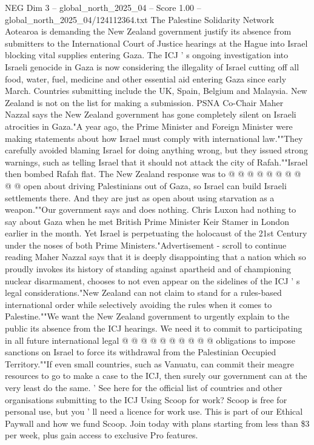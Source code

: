 \begin{textsample}{NEG Dim 3 – global\_north\_2025\_04 – Score 1.00 – global\_north\_2025\_04/124112364.txt}  \label{ex:f3_neg_416}
The Palestine Solidarity Network Aotearoa is demanding the New Zealand government justify its absence from submitters to the International Court of Justice hearings at the Hague into Israel blocking vital supplies entering Gaza.
The ICJ ' s ongoing investigation into Israeli genocide in Gaza is now considering the illegality of Israel cutting off all food, water, fuel, medicine and other essential aid entering Gaza since early March.
Countries submitting include the UK, Spain, Belgium and Malaysia.
New Zealand is not on the list for making a submission.
PSNA Co-Chair Maher Nazzal says the New Zealand government has gone completely silent on Israeli atrocities in Gaza."A year ago, the Prime Minister and Foreign Minister were making statements about how Israel must comply with international law.""They carefully avoided blaming Israel for doing anything wrong, but they issued strong warnings, such as telling Israel that it should not attack the city of Rafah.""Israel then bombed Rafah flat.
The New Zealand response was to @ @ @ @ @ @ @ @ @ @ open about driving Palestinians out of Gaza, so Israel can build Israeli settlements there.
And they are just as open about using starvation as a weapon.""Our government says and does nothing.
Chris Luxon had nothing to say about Gaza when he met British Prime Minister Keir Stamer in London earlier in the month.
Yet Israel is perpetuating the holocaust of the 21st Century under the noses of both Prime Ministers."Advertisement - scroll to continue reading Maher Nazzal says that it is deeply disappointing that a nation which so proudly invokes its history of standing against apartheid and of championing nuclear disarmament, chooses to not even appear on the sidelines of the ICJ ' s legal considerations."New Zealand can not claim to stand for a rules-based international order while selectively avoiding the rules when it comes to Palestine.""We want the New Zealand government to urgently explain to the public its absence from the ICJ hearings.
We need it to commit to participating in all future international legal @ @ @ @ @ @ @ @ @ @ obligations to impose sanctions on Israel to force its withdrawal from the Palestinian Occupied Territory.""If even small countries, such as Vanuatu, can commit their meagre resources to go to make a case to the ICJ, then surely our government can at the very least do the same. ' See here for the official list of countries and other organisations submitting to the ICJ Using Scoop for work?
Scoop is free for personal use, but you ' ll need a licence for work use.
This is part of our Ethical Paywall and how we fund Scoop.
Join today with plans starting from less than \$3 per week, plus gain access to exclusive Pro features.

\end{textsample}
